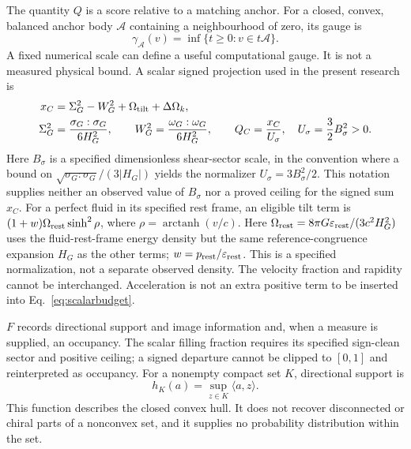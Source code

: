 The quantity $Q$ is a score relative to a matching anchor. For a closed, convex, balanced anchor body $\mathcal A$ containing a neighbourhood of zero, its gauge is
\begin{equation}
 \gamma_{\mathcal A}(v)=\inf\{t\geq0:v\in t\mathcal A\}.
 \label{eq:gauge}
\end{equation}
A fixed numerical scale can define a useful computational gauge. It is not a measured physical bound. A scalar signed projection used in the present research is
\begin{align}
 x_C&=\Sigma_G^2-W_G^2+\Omega_{\rm tilt}+\Delta\Omega_k,\nonumber\\
 \Sigma_G^2&=\frac{\sigma_G:\sigma_G}{6H_G^2},\qquad
 W_G^2=\frac{\omega_G:\omega_G}{6H_G^2},\qquad
 Q_C=\frac{x_C}{U_\sigma},\quad U_\sigma=\frac32 B_\sigma^2>0.
 \label{eq:scalarbudget}
\end{align}
Here $B_\sigma$ is a specified dimensionless shear-sector scale, in the convention where a bound on $\sqrt{\sigma_G:\sigma_G}/(3|H_G|)$ yields the normalizer $U_\sigma=3B_\sigma^2/2$. This notation supplies neither an observed value of $B_\sigma$ nor a proved ceiling for the signed sum $x_C$. For a perfect fluid in its specified rest frame, an eligible tilt term is $(1+w)\Omega_{\rm rest}\sinh^2\rho$, where $\rho=\operatorname{arctanh}(v/c)$. Here $\Omega_{\rm rest}=8\pi G\varepsilon_{\rm rest}/(3c^2H_G^2)$ uses the fluid-rest-frame energy density but the same reference-congruence expansion $H_G$ as the other terms; $w=p_{\rm rest}/\varepsilon_{\rm rest}$. This is a specified normalization, not a separate observed density. The velocity fraction and rapidity cannot be interchanged. Acceleration is not an extra positive term to be inserted into Eq.~\eqref{eq:scalarbudget}.

$F$ records directional support and image information and, when a measure is supplied, an occupancy. The scalar filling fraction requires its specified sign-clean sector and positive ceiling; a signed departure cannot be clipped to $[0,1]$ and reinterpreted as occupancy. For a nonempty compact set $K$, directional support is
\begin{equation}
 h_K(a)=\sup_{z\in K}\langle a,z\rangle.
\end{equation}
This function describes the closed convex hull. It does not recover disconnected or chiral parts of a nonconvex set, and it supplies no probability distribution within the set.

